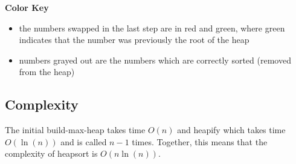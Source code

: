 \textbf{Color Key}

\begin{itemize}
    \item the numbers swapped in the last step are in {\color{red}red} and {\color{green}green}, where {\color{green}green} indicates that the number was previously the root of the heap
    \item numbers {\color{gray}grayed} out are the numbers which are correctly sorted (removed from the heap)
\end{itemize}

\subsection{Complexity}

The initial build-max-heap takes time \(O(n)\) and heapify which takes time \(O(\ln(n))\) and is called \(n - 1\) times. Together, this means that the complexity of heapsort is \(O(n \ln(n))\).\cite[p.~136]{bib:introductiontoalgorithms}


